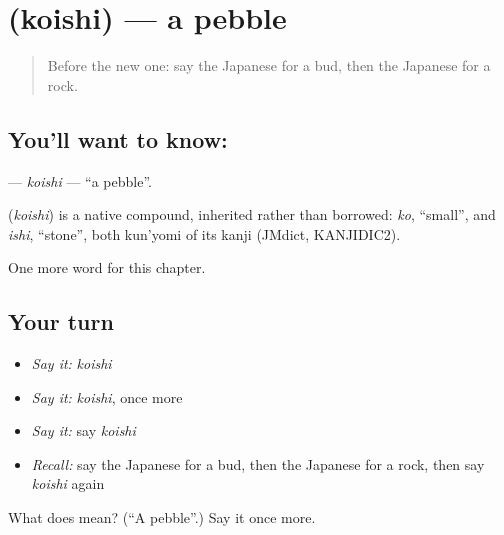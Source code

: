 \section[\texorpdfstring{\ja{こいし} (koishi)}{こいし (koishi)}]{ (koishi) — a pebble}

\label{lesson:JA-C106-koishi}



\begin{quote}
Before the new one: say the Japanese for a bud, then the Japanese for a rock.
\end{quote}

\subsection*{You'll want to know: }
\textbf{} — \emph{koishi} — \textquotedblleft{}a pebble\textquotedblright{}.

\begin{cousinweb}
\textbf{} (\emph{koishi}) is a native compound, inherited rather than borrowed: \emph{ko}, \textquotedblleft{}small\textquotedblright{}, and \emph{ishi}, \textquotedblleft{}stone\textquotedblright{}, both kun'yomi of its kanji (JMdict, KANJIDIC2).
\end{cousinweb}

\begin{grammarlens}[title={What you've built}]
One more word for this chapter.
\end{grammarlens}

\subsection*{Your turn}
\begin{itemize}
\raggedright
  \item \emph{Say it:} \emph{koishi}
  \item \emph{Say it:} \emph{koishi}, once more
  \item \emph{Say it:} say \emph{koishi}
  \item \emph{Recall:} say the Japanese for a bud, then the Japanese for a rock, then say \emph{koishi} again
\end{itemize}

\begin{tcolorbox}[breakable,colback=teal!4,colframe=teal!35!black,title={Before you move on}]
What does  mean? (\textquotedblleft{}A pebble\textquotedblright{}.) Say it once more.
\end{tcolorbox}
